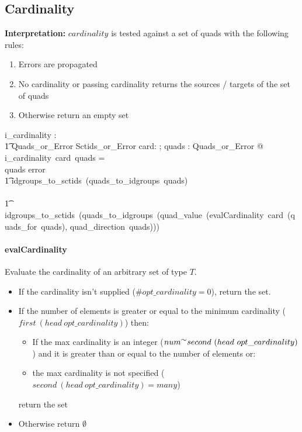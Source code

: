 \documentclass{article}
\begin{document}
\subsection{Cardinality}
\textbf{Interpretation:}
$cardinality$ is tested against a set of quads with the following rules:
\begin{enumerate}
\item Errors are propagated
\item No cardinality or passing cardinality returns  the sources / targets of the set of quads
\item Otherwise return an empty set
\end{enumerate}
\begin{gendef}
   i\_cardinality :  \\
\t1 \optional[cardinality] \fun Quads\_or\_Error \fun  Sctids\_or\_Error
\where
   \forall card: \optional[cardinality]; quads : Quads\_or\_Error  @ \\
i\_cardinality~card~quads = \\
\IF quads \in \ran error \\
\t1 \THEN idgroups\_to\_sctids~(quads\_to\_idgroups~quads) \\
\ELSE  \\
\t1 idgroups\_to\_sctids~(quads\_to\_idgroups~(quad\_value~(evalCardinality~card~(quads\_for~quads), quad\_direction~quads))) 
\end{gendef}

\paragraph{evalCardinality}
Evaluate the cardinality of an arbitrary set of type $T$.  
\begin{itemize}[noitemsep,nolistsep]
\item If the cardinality isn't supplied ($\#opt\_cardinality = 0$), return the set.
\item If the number of elements is greater or equal to the minimum cardinality ($first~(head~opt\_cardinality)$) then:
\begin{itemize}[noitemsep,nolistsep]
\item If the max cardinality is an integer ($num \inv second~(head~opt\_cardinality)$) and it is greater than or equal to the number of elements or:
\item the max cardinality is not specified ($second~(head~opt\_cardinality) = many$)
\end{itemize}
return the set
\item Otherwise return $\emptyset$
\end{itemize}
\end{document}

